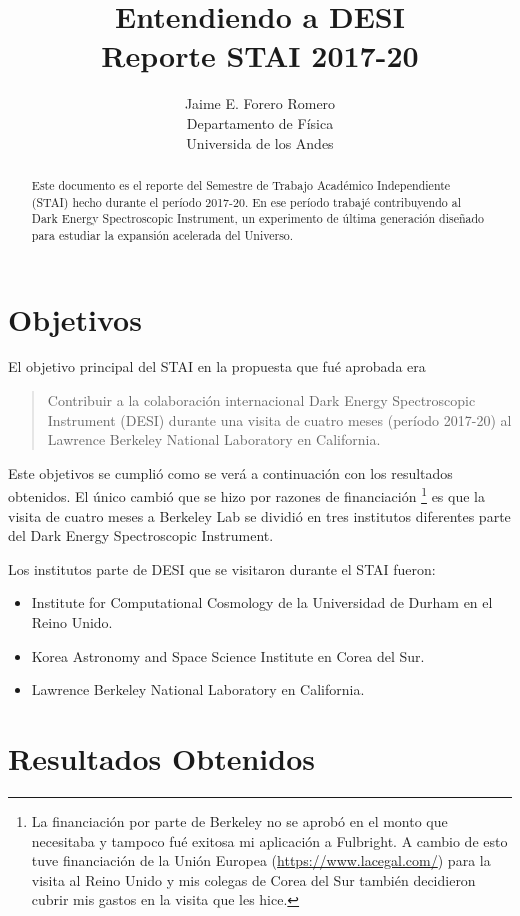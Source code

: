 \documentclass[12pt,spanish]{article}
\title{{\sc Entendiendo a DESI}\\{\small\sc Reporte STAI 2017-20}}
\author{Jaime E. Forero Romero\\Departamento de F\'isica\\Universida
  de los Andes}
\begin{document}
\maketitle
\begin{abstract}
Este documento es el reporte del Semestre de Trabajo Acad\'emico
Independiente (STAI) hecho durante el per\'iodo 2017-20. 
En ese per\'iodo trabaj\'e contribuyendo al Dark Energy Spectroscopic
Instrument, un experimento de \'ultima generaci\'on dise\~nado para
estudiar la expansi\'on acelerada del Universo.
\end{abstract}

\section{Objetivos}

El objetivo principal del STAI en la propuesta que fu\'e aprobada era 
\begin{quote}
Contribuir a la colaboraci\'on internacional Dark Energy Spectroscopic
Instrument (DESI) durante una visita de cuatro meses (per\'iodo
2017-20) al Lawrence Berkeley National Laboratory en California.  
\end{quote}

Este objetivos se cumpli\'o como se ver\'a a continuaci\'on con los
resultados obtenidos.
El \'unico cambi\'o que se hizo por razones de
financiaci\'on \footnote{La financiaci\'on por parte de Berkeley no se
  aprob\'o en el monto que necesitaba y tampoco fu\'e exitosa mi
  aplicaci\'on a Fulbright. A cambio de esto tuve
  financiaci\'on de la Uni\'on Europea (\url{https://www.lacegal.com/})
  para la visita al Reino Unido y mis colegas de Corea del Sur
  tambi\'en decidieron cubrir mis gastos en la visita que les hice.}
es que la visita de cuatro meses a Berkeley Lab se dividi\'o en tres
institutos diferentes parte del Dark Energy Spectroscopic Instrument.   


Los institutos parte de DESI que se visitaron durante el STAI fueron:
\begin{itemize}
\item{Institute for Computational Cosmology de la Universidad de
  Durham en el Reino Unido.}
\item{Korea Astronomy and Space Science Institute en Corea del Sur.}
\item{Lawrence Berkeley National Laboratory en California.}
\end{itemize}


\section*{Resultados Obtenidos}
\end{document}
